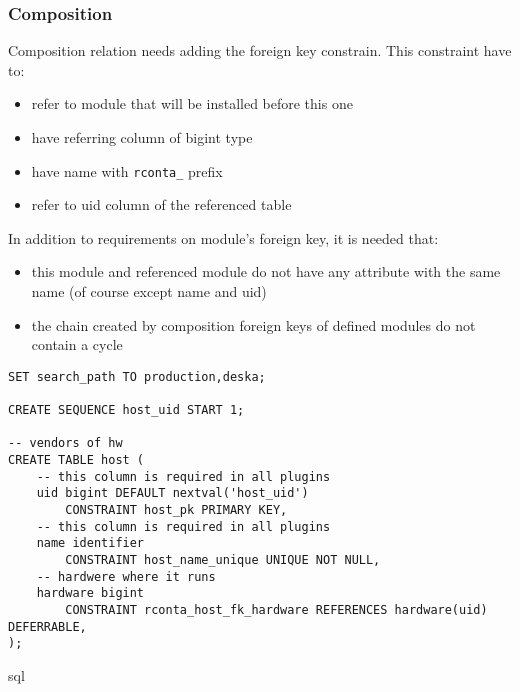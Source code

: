 \documentclass[deska]{subfiles}
\begin{document}
\subsubsection{Composition}
Composition relation needs adding the foreign key constrain. This constraint have to:
\begin{itemize}
    \item refer to module that will be installed before this one
    \item have referring column of bigint type
    \item have name with {\tt rconta\_} prefix
    \item refer to uid column of the referenced table
\end{itemize}
In addition to requirements on module's foreign key, it is needed that:
\begin{itemize}
    \item this module and referenced module do not have any attribute with the same name (of course except name and uid)
    \item the chain created by composition foreign keys of defined modules do not contain a cycle
\end{itemize}

\begin{verbatim}
SET search_path TO production,deska;

CREATE SEQUENCE host_uid START 1;

-- vendors of hw
CREATE TABLE host (
    -- this column is required in all plugins
    uid bigint DEFAULT nextval('host_uid')
        CONSTRAINT host_pk PRIMARY KEY,
    -- this column is required in all plugins
    name identifier
        CONSTRAINT host_name_unique UNIQUE NOT NULL,
    -- hardwere where it runs
    hardware bigint
        CONSTRAINT rconta_host_fk_hardware REFERENCES hardware(uid) DEFERRABLE,
);
\end{verbatim}{sql}
\end{document}

